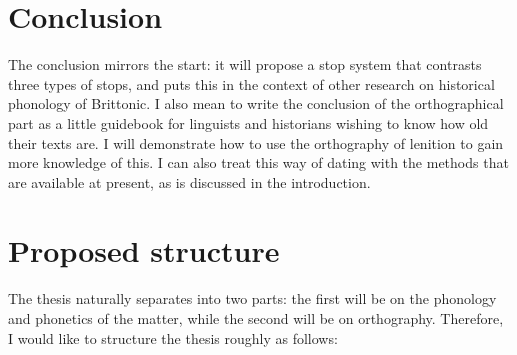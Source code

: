 \begin{english}
\section{Conclusion}
The conclusion mirrors the start: it will propose a stop system that contrasts three types of stops, and puts this in the context of other research on historical phonology of Brittonic. I also mean to write the conclusion of the orthographical part as a little guidebook for linguists and historians wishing to know how old their texts are. I will demonstrate how to use the orthography of lenition to gain more knowledge of this. I can also treat this way of dating with the methods that are available at present, as is discussed in the introduction.

\section{Proposed structure}
The thesis naturally separates into two parts: the first will be on the phonology and phonetics of the matter, while the second will be on orthography. Therefore, I would like to structure the thesis roughly as follows:


\end{english}
